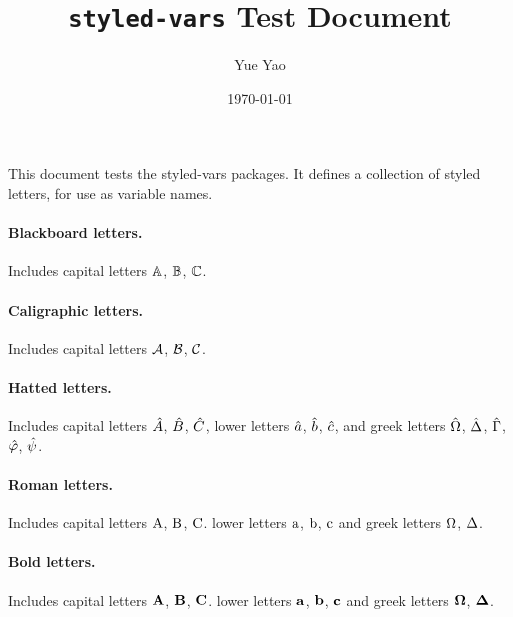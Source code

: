 \documentclass[10pt]{article}
\title{\texttt{styled-vars} Test Document}%
\author{Yue Yao}
\date{\today}
\begin{document}
\maketitle{}

This document tests the styled-vars packages. It defines a collection of styled letters, for
use as variable names.

\paragraph{Blackboard letters.} Includes capital letters $\mathbb{A}$, $\mathbb{B}$, $\mathbb{C}$.

\paragraph{Caligraphic letters.} Includes capital letters $\mathcal{A}$, $\mathcal{B}$, $\mathcal{C}$.

\paragraph{Hatted letters.} Includes capital letters $\hat{A}$, $\hat{B}$, $\hat{C}$, 
lower letters $\hat{a}$, $\hat{b}$, $\hat{c}$, and
greek letters $\hat{\Omega}$, $\hat{\Delta}$, $\hat{\Gamma}$, $\hat{\varphi}$, $\hat{\psi}$.

\paragraph{Roman letters.} Includes capital letters $\mathrm{A}$, $\mathrm{B}$, $\mathrm{C}$.
lower letters $\mathrm{a}$, $\mathrm{b}$, $\mathrm{c}$ and 
greek letters $\mathrm{\Omega}$, $\mathrm{\Delta}$.

\paragraph{Bold letters.} Includes capital letters $\mathbf{A}$, $\mathbf{B}$, $\mathbf{C}$.
lower letters $\mathbf{a}$, $\mathbf{b}$, $\mathbf{c}$ and 
greek letters $\mathbf{\Omega}$, $\mathbf{\Delta}$.
\end{document}
